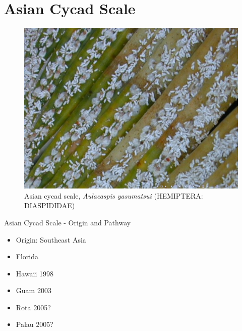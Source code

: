 \documentclass[]{beamer}
\begin{document}
\section{Asian Cycad Scale}

\begin{frame}{07}
	\begin{figure}
		\includegraphics[height=0.7\textheight]{asian-cycad-scale/output-07.png}
		\caption{Asian cycad scale, \textit{Aulacaspis yasumatsui} (HEMIPTERA: DIASPIDIDAE)}
	\end{figure}
\end{frame}

\begin{frame}{Asian Cycad Scale - Origin and Pathway}
	\begin{itemize}
		\item Origin: Southeast Asia
		\item Florida
		\item Hawaii 1998
		\item Guam 2003
		\item Rota 2005?
		\item Palau 2005?
	\end{itemize}
\end{frame}

\begin{frame}{09}
\end{frame}

\begin{frame}{10}
\end{frame}
\end{document}
